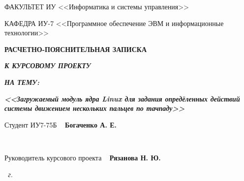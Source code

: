 \begin{titlepage}
\begin{flushleft}
		ФАКУЛЬТЕТ ИУ <<Информатика и системы управления>>

		КАФЕДРА ИУ-7 <<Программное обеспечение ЭВМ и информационные технологии>>
	\end{flushleft}

	\vfill

	\begin{center}
		\fontsize{20pt}{\baselineskip}\selectfont

		\textbf{РАСЧЕТНО-ПОЯСНИТЕЛЬНАЯ ЗАПИСКА}

		\textbf{\textit{К КУРСОВОМУ ПРОЕКТУ}}

		\textbf{\textit{НА ТЕМУ:}}
	\end{center}

	\begin{center}
		\fontsize{20pt}{0.6cm}\selectfont 
		
		\textit{\bfseries{<<Загружаемый модуль ядра Linux для задания опредёленных действий системы движением нескольких пальцев по тачпаду>>}}
		
	\end{center}

	\vfill
	
	\fontsize{12pt}{0.6cm}\selectfont
	Студент \hspace{1.1cm} ИУ7-75Б \hspace{3.83cm} \uline{\mbox{\hspace*{3.5cm}}}~ \textbf{Богаченко А. Е.}
	
	~~

	
	Руководитель курсового проекта \hspace{2.3cm} \uline{\mbox{\hspace*{3.5cm}}}~ \textbf{Рязанова Н. Ю.}
	
	
	\vfill

	\begin{center}
		\normalsize \textit{\the \year~г.}
	\end{center}
\end{titlepage}